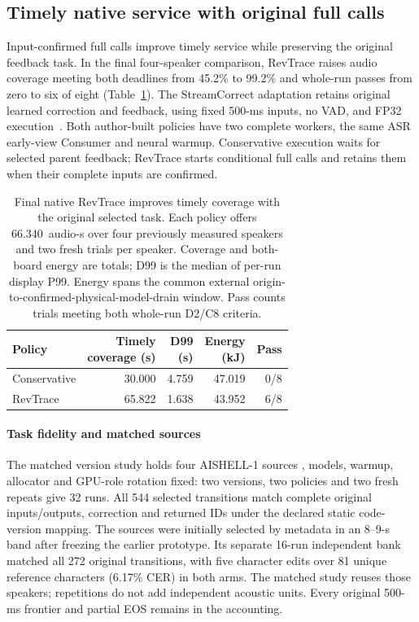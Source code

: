 \subsection{Timely native service with original full calls}
\label{subsec:native_retention_eval}
Input-confirmed full calls improve timely service while preserving the
original feedback task. In the final four-speaker comparison, RevTrace
raises audio coverage meeting both deadlines from 45.2\% to 99.2\% and
whole-run passes from zero to six of eight
(Table~\ref{tab:native_full_confirm}). The StreamCorrect adaptation retains
original learned correction and feedback, using fixed 500-ms inputs,
no VAD, and FP32 execution~\cite{vu2026streamcorrect}. Both author-built
policies have two complete workers, the same ASR early-view Consumer and
neural warmup. Conservative execution waits for selected parent feedback;
RevTrace starts conditional full calls and retains them when their
complete inputs are confirmed.

\begin{table}[t]
\centering
\caption{Final native RevTrace improves timely coverage with the original
selected task. Each policy offers 66.340~audio-s over four previously
measured speakers and two fresh trials per speaker. Coverage and both-board
energy are totals; D99 is the median of per-run display P99. Energy spans
the common external origin-to-confirmed-physical-model-drain window.
Pass counts trials meeting both whole-run D2/C8 criteria.}
\label{tab:native_full_confirm}
\small\setlength{\tabcolsep}{3pt}
\begin{tabular}{@{}lrrrr@{}}
\toprule
Policy & \shortstack{Timely\\coverage (s)} & \shortstack{D99\\(s)} &
\shortstack{Energy\\(kJ)} & Pass\\
\midrule
Conservative & 30.000 & 4.759 & 47.019 & 0/8\\
RevTrace & 65.822 & 1.638 & 43.952 & 6/8\\
\bottomrule
\end{tabular}
\end{table}

\paragraph{Task fidelity and matched sources}
The matched version study holds four AISHELL-1 sources
\cite{bu2017aishell}, models, warmup, allocator and GPU-role rotation fixed:
two versions, two policies and two fresh repeats give 32 runs. All 544
selected transitions match complete original inputs/outputs, correction
and returned IDs under the declared static code-version mapping. The
sources were initially selected by metadata in an 8--9-s band after
freezing the earlier prototype. Its separate 16-run independent bank
matched all 272 original transitions, with five character edits over 81
unique reference characters (6.17\% CER) in both arms. The matched study
reuses those speakers; repetitions do not add independent acoustic units.
Every original 500-ms frontier and partial EOS remains in the accounting.

